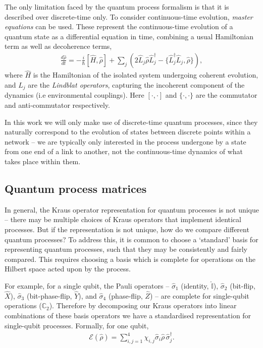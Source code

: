 \documentclass[aps, rmp, twocolumn, amsmath, amssymb, nofootinbib, superscriptaddress, longbibliography, floatfix, table-of-contents, eqsecnum]{revtex4-1}
\begin{document}
The only limitation faced by the quantum process formalism is that it is described over discrete-time only. To consider continuous-time evolution, \textit{master equations} can be used. These represent the continuous-time evolution of a quantum state as a differential equation in time, combining a usual Hamiltonian term as well as decoherence terms,
\begin{align}
\frac{d\hat\rho}{dt} = -\frac{i}{\hbar}[\hat{H},\hat\rho] + \sum_j (2\hat{L}_j\hat\rho\hat{L}_j^\dag - \{\hat{L}_j^\dag\hat{L}_j,\hat\rho\}),
\end{align}
where $\hat{H}$ is the Hamiltonian of the isolated system undergoing coherent evolution, and $\hat{L}_j$ are the \textit{Lindblat operators}, capturing the incoherent component of the dynamics (i.e environmental couplings). Here $[\cdot,\cdot]$ and $\{\cdot,\cdot\}$ are the commutator and anti-commutator respectively.

In this work we will only make use of discrete-time quantum processes, since they naturally correspond to the evolution of states between discrete points within a network -- we are typically only interested in the process undergone by a state from one end of a link to another, not the continuous-time dynamics of what takes place within them.

%
%

\subsection{Quantum process matrices} 

In general, the Kraus operator representation for quantum processes is not unique -- there may be multiple choices of Kraus operators that implement identical processes. But if the representation is not unique, how do we compare different quantum processes? To address this, it is common to choose a `standard' basis for representing quantum processes, such that they may be consistently and fairly compared. This requires choosing a basis which is complete for operations on the Hilbert space acted upon by the process.

For example, for a single qubit, the Pauli operators -- $\hat\sigma_1$ (identity, $\mathbb{\hat{I}}$), $\hat\sigma_2$ (bit-flip, $\hat{X}$), $\hat\sigma_3$ (bit-phase-flip, $\hat{Y}$), and $\hat\sigma_4$ (phase-flip, $\hat{Z}$) -- are complete for single-qubit operations ($\mathbb{C}_2$). Therefore by decomposing our Kraus operators into linear combinations of these basis operators we have a standardised representation for single-qubit processes. Formally, for one qubit,
\begin{align} \label{eq:process_matrix}
\mathcal{E}(\hat\rho) = \sum_{i,j=1}^4 \chi_{i,j} \hat{\sigma}_i\hat\rho\,\hat{\sigma}_j^\dag.
\end{align}
\end{document}
